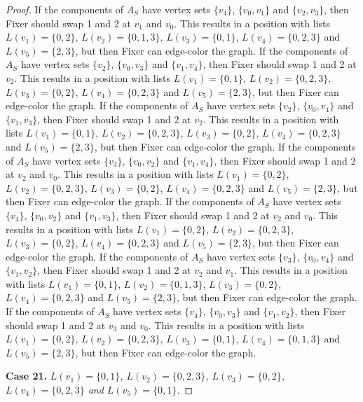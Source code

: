 \documentclass[12pt]{amsart}
\theoremstyle{plain}
\theoremstyle{definition}
\theoremstyle{remark}
\begin{document}
\begin{proof}
If the components of $A_S$ have vertex sets $\{v_4\}$, $\{v_0, v_1\}$ and $\{v_2, v_3\}$, then Fixer should swap 1 and 2 at $v_1$ and $v_0$. This results in a position with lists $L(v_1) = \{0, 2\}$, $L(v_2) = \{0, 1, 3\}$, $L(v_3) = \{0, 1\}$, $L(v_4) = \{0, 2, 3\}$ and $L(v_5) = \{2, 3\}$, but then Fixer can edge-color the graph.
If the components of $A_S$ have vertex sets $\{v_2\}$, $\{v_0, v_3\}$ and $\{v_1, v_4\}$, then Fixer should swap 1 and 2 at $v_2$. This results in a position with lists $L(v_1) = \{0, 1\}$, $L(v_2) = \{0, 2, 3\}$, $L(v_3) = \{0, 2\}$, $L(v_4) = \{0, 2, 3\}$ and $L(v_5) = \{2, 3\}$, but then Fixer can edge-color the graph.
If the components of $A_S$ have vertex sets $\{v_2\}$, $\{v_0, v_4\}$ and $\{v_1, v_3\}$, then Fixer should swap 1 and 2 at $v_2$. This results in a position with lists $L(v_1) = \{0, 1\}$, $L(v_2) = \{0, 2, 3\}$, $L(v_3) = \{0, 2\}$, $L(v_4) = \{0, 2, 3\}$ and $L(v_5) = \{2, 3\}$, but then Fixer can edge-color the graph.
If the components of $A_S$ have vertex sets $\{v_3\}$, $\{v_0, v_2\}$ and $\{v_1, v_4\}$, then Fixer should swap 1 and 2 at $v_2$ and $v_0$. This results in a position with lists $L(v_1) = \{0, 2\}$, $L(v_2) = \{0, 2, 3\}$, $L(v_3) = \{0, 2\}$, $L(v_4) = \{0, 2, 3\}$ and $L(v_5) = \{2, 3\}$, but then Fixer can edge-color the graph.
If the components of $A_S$ have vertex sets $\{v_4\}$, $\{v_0, v_2\}$ and $\{v_1, v_3\}$, then Fixer should swap 1 and 2 at $v_2$ and $v_0$. This results in a position with lists $L(v_1) = \{0, 2\}$, $L(v_2) = \{0, 2, 3\}$, $L(v_3) = \{0, 2\}$, $L(v_4) = \{0, 2, 3\}$ and $L(v_5) = \{2, 3\}$, but then Fixer can edge-color the graph.
If the components of $A_S$ have vertex sets $\{v_3\}$, $\{v_0, v_4\}$ and $\{v_1, v_2\}$, then Fixer should swap 1 and 2 at $v_2$ and $v_1$. This results in a position with lists $L(v_1) = \{0, 1\}$, $L(v_2) = \{0, 1, 3\}$, $L(v_3) = \{0, 2\}$, $L(v_4) = \{0, 2, 3\}$ and $L(v_5) = \{2, 3\}$, but then Fixer can edge-color the graph.
If the components of $A_S$ have vertex sets $\{v_4\}$, $\{v_0, v_3\}$ and $\{v_1, v_2\}$, then Fixer should swap 1 and 2 at $v_3$ and $v_0$. This results in a position with lists $L(v_1) = \{0, 2\}$, $L(v_2) = \{0, 2, 3\}$, $L(v_3) = \{0, 1\}$, $L(v_4) = \{0, 1, 3\}$ and $L(v_5) = \{2, 3\}$, but then Fixer can edge-color the graph.

\noindent\textbf{Case 21.  }\textit{$L(v_1) = \{0, 1\}$, $L(v_2) = \{0, 2, 3\}$, $L(v_3) = \{0, 2\}$, $L(v_4) = \{0, 2, 3\}$ and $L(v_5) = \{0, 1\}$.}


\end{proof}
\end{document}
